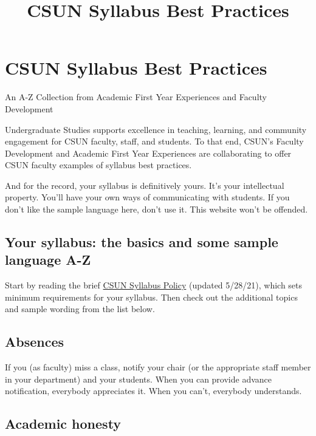 \documentclass[
  letterpaper,
  DIV=11,
  numbers=noendperiod]{scrartcl}
\title{CSUN Syllabus Best Practices}
\author{}
\date{}
\begin{document}
\maketitle


\section{CSUN Syllabus Best
Practices}\label{csun-syllabus-best-practices}

An A-Z Collection from Academic First Year Experiences and Faculty
Development

Undergraduate Studies supports excellence in teaching, learning, and
community engagement for CSUN faculty, staff, and students. To that end,
CSUN's Faculty Development and Academic First Year Experiences are
collaborating to offer CSUN faculty examples of syllabus best practices.

And for the record, your syllabus is definitively yours. It's your
intellectual property. You'll have your own ways of communicating with
students. If you don't like the sample language here, don't use it. This
website won't be offended.

\subsection{Your syllabus: the basics and some sample language
A-Z}\label{your-syllabus-the-basics-and-some-sample-language-a-z}

Start by reading the brief
\href{https://catalog.csun.edu/policies/syllabus-policy/}{CSUN Syllabus
Policy} (updated 5/28/21), which sets minimum requirements for your
syllabus. Then check out the additional topics and sample wording from
the list below.

\subsection{Absences}\label{absences}

If you (as faculty) miss a class, notify your chair (or the appropriate
staff member in your department) and your students. When you can provide
advance notification, everybody appreciates it. When you can't,
everybody understands.

\subsection{Academic honesty}\label{academic-honesty}
\end{document}
